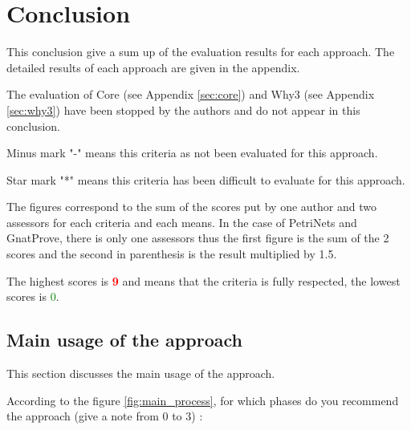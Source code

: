 

\chapter{Conclusion}
\label{sec:concl}

This conclusion give a sum up of the evaluation results for each approach. The detailed results of each approach are given in the appendix.

The evaluation of Core (see Appendix \ref{sec:core}) and Why3 (see Appendix \ref{sec:why3}) have been stopped by the authors and do not appear in this conclusion.

Minus mark "-" means this criteria as not been evaluated for this approach.

Star mark "*" means this criteria has been difficult to evaluate for this approach.

The figures correspond to the sum of the scores put by one author and two assessors for each criteria and each means.
In the case of PetriNets and GnatProve, there is only one assessors thus the first figure is the sum of the 2 scores and the second in parenthesis is the result multiplied by 1.5.

The highest scores is \textcolor{red}{\textbf{9}} and means that the criteria is fully respected, the lowest scores is \textcolor{green}{0}.

\section{Main usage of the approach}
\label{main_usage}
This section discusses the main usage of the approach.

According to the figure \ref{fig:main_process}, for which phases do you recommend the approach (give a note from 0 to  3) :

